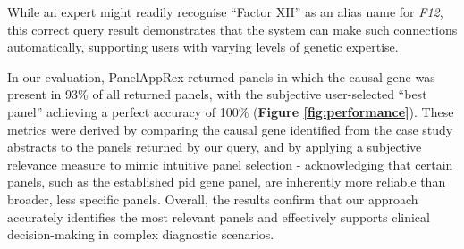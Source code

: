 While an expert might readily recognise ``Factor XII'' as an alias name for \textit{F12}, this correct query result demonstrates that the system can make such connections automatically, supporting users with varying levels of genetic expertise.

In our evaluation, PanelAppRex returned panels in which the causal gene was present in 93\% of all returned panels, with the subjective user-selected ``best panel'' achieving a perfect accuracy of 100\% 
(\textbf{Figure \ref{fig:performance}}).
 These metrics were derived by comparing the causal gene identified from the case study abstracts to the panels returned by our query, and by applying a subjective relevance measure to mimic intuitive panel selection - acknowledging that certain panels, such as the established \ac{pid} gene panel, are inherently more reliable than broader, less specific panels.
Overall, the results confirm that our approach accurately identifies the most relevant panels and effectively supports clinical decision-making in complex diagnostic scenarios.

